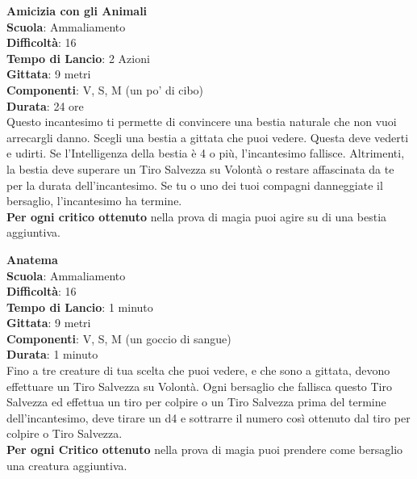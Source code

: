 \begin{multicols}{2}
\medskip\textbf{Amicizia con gli Animali}\\
\textbf{Scuola}: Ammaliamento\\
\textbf{Difficoltà}: 16\\
\textbf{Tempo di Lancio}: 2 Azioni\\
\textbf{Gittata}: 9 metri\\
\textbf{Componenti}: V, S, M (un po' di cibo)\\
\textbf{Durata}: 24 ore\\
Questo incantesimo ti permette di convincere una bestia naturale che non vuoi arrecargli danno. Scegli una bestia a gittata che puoi vedere. Questa deve vederti e udirti. Se l'Intelligenza della bestia è 4 o più, l'incantesimo fallisce. Altrimenti, la bestia deve superare un Tiro Salvezza su Volontà o restare affascinata da te per la durata dell'incantesimo. Se tu o uno dei tuoi compagni danneggiate il bersaglio, l'incantesimo ha termine.\\
\textbf{Per ogni critico ottenuto} nella prova di magia puoi agire su di una bestia aggiuntiva. 

\medskip\textbf{Anatema}\\
\textbf{Scuola}: Ammaliamento\\
\textbf{Difficoltà}: 16\\
\textbf{Tempo di Lancio}: 1 minuto\\
\textbf{Gittata}: 9 metri\\
\textbf{Componenti}: V, S, M (un goccio di sangue)\\
\textbf{Durata}: 1 minuto\\
Fino a tre creature di tua scelta che puoi vedere, e che sono a gittata, devono effettuare un Tiro Salvezza su Volontà. Ogni bersaglio che fallisca questo Tiro Salvezza ed effettua un tiro per colpire o un Tiro Salvezza prima del termine dell'incantesimo, deve tirare un d4 e sottrarre il numero così ottenuto dal tiro per colpire o Tiro Salvezza.\\
\textbf{Per ogni Critico ottenuto} nella prova di magia puoi prendere come bersaglio una creatura aggiuntiva.


\end{multicols}

